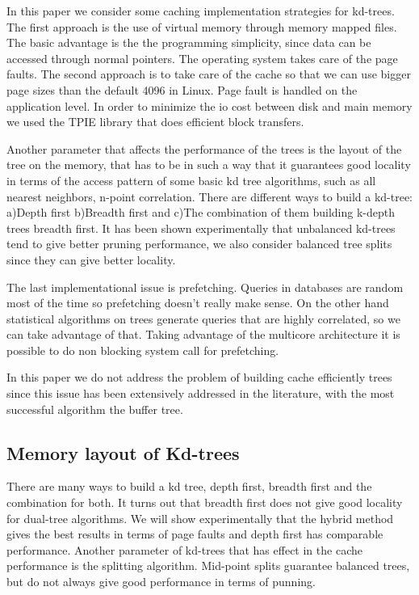 \documentclass[12pt,letterpaper,doublespaced,ETD,dvips,proposal]{gtthesis}
\begin{document}
\begin{Body}
In this paper we consider some caching implementation strategies for
kd-trees. The first approach is the use of virtual memory through
memory mapped files. The basic advantage is the the programming
simplicity, since data can be accessed through normal pointers. The
operating system takes care of the page faults. The second approach
is to take care of the cache so that we can use bigger page sizes
than the default 4096 in Linux. Page fault is handled on the
application level. In order to minimize the io cost between disk and
main memory we used the TPIE library that does efficient block
transfers.

Another parameter that affects the performance of the trees is the
layout of the tree on the memory, that has to be in such a way that
it guarantees good locality in terms of the access pattern of some
basic kd tree algorithms, such as all  nearest neighbors, n-point
correlation. There are different ways to build a kd-tree: a)Depth
first b)Breadth first and c)The combination of them building k-depth
trees breadth first. It has been shown experimentally that
unbalanced kd-trees tend to give better pruning performance, we also
consider balanced tree splits since they can give better locality.

The last implementational issue is prefetching.  Queries in
databases are random most of the time so prefetching doesn't really
make sense. On the other hand statistical algorithms on trees
generate queries that are highly correlated, so we can take
advantage of that. Taking advantage of the multicore architecture it
is possible to do non blocking system call for prefetching.

In this paper we do not address the problem of building cache
efficiently trees since this issue has been extensively addressed in
the literature, with the most successful algorithm the buffer tree.

\subsection{Memory layout of Kd-trees} There are many ways to build a
kd tree, depth first, breadth first and the combination for both. It
turns out that breadth first does not give good locality for
dual-tree algorithms. We will show experimentally that the hybrid
method gives the best results in terms of page faults and depth
first has comparable performance. Another parameter of kd-trees that
has effect in the cache performance is the splitting algorithm.
Mid-point splits  guarantee balanced trees, but do not always give
good performance in terms of punning.


\end{Body}
\end{document}
